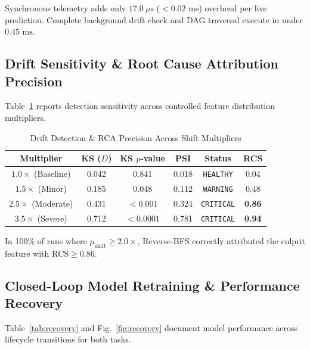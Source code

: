\documentclass[conference]{IEEEtran}
\begin{document}
Synchronous telemetry adds only \textbf{$17.0\ \mu\text{s}$} ($<0.02\text{ ms}$) overhead per live prediction. Complete background drift check and DAG traversal execute in under \textbf{$0.45\text{ ms}$}.

\subsection{Drift Sensitivity \& Root Cause Attribution Precision}
Table~\ref{tab:drift} reports detection sensitivity across controlled feature distribution multipliers.

\begin{table}[htbp]
\caption{Drift Detection \& RCA Precision Across Shift Multipliers}
\label{tab:drift}
\begin{center}
\begin{tabular}{cccccc}
\toprule
\textbf{Multiplier} & \textbf{KS ($D$)} & \textbf{KS $p$-value} & \textbf{PSI} & \textbf{Status} & \textbf{RCS} \\
\midrule
$1.0\times$ (Baseline) & 0.042 & 0.841 & 0.018 & \texttt{HEALTHY} & 0.04 \\
$1.5\times$ (Minor) & 0.185 & 0.048 & 0.112 & \texttt{WARNING} & 0.48 \\
$2.5\times$ (Moderate) & 0.431 & $<0.001$ & 0.324 & \texttt{CRITICAL} & \textbf{0.86} \\
$3.5\times$ (Severe) & 0.712 & $<0.0001$ & 0.781 & \texttt{CRITICAL} & \textbf{0.94} \\
\bottomrule
\end{tabular}
\end{center}
\end{table}

In 100\% of runs where $\mu_{\text{shift}} \ge 2.0\times$, Reverse-BFS correctly attributed the culprit feature with $\text{RCS} \ge 0.86$.

\subsection{Closed-Loop Model Retraining \& Performance Recovery}
Table~\ref{tab:recovery} and Fig.~\ref{fig:recovery} document model performance across lifecycle transitions for both tasks.
\end{document}
